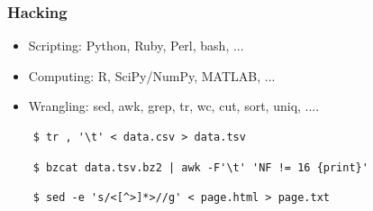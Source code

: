 \documentclass[xcolor=dvipsnames, 9pt]{beamer}
\begin{document}
\begin{frame}[fragile]
  \frametitle{Hacking}

  \begin{itemize}
    \item Scripting: Python, Ruby, Perl, bash, ...
    \item Computing: R, SciPy/NumPy, MATLAB, ...
    \item Wrangling: sed, awk, grep, tr, wc, cut, sort, uniq, ....
  \end{itemize}

  \begin{verbatim}
    $ tr , '\t' < data.csv > data.tsv
  \end{verbatim}

  \begin{verbatim}
    $ bzcat data.tsv.bz2 | awk -F'\t' 'NF != 16 {print}'
  \end{verbatim}

  \begin{verbatim}
    $ sed -e 's/<[^>]*>//g' < page.html > page.txt
  \end{verbatim}

\end{frame}
\end{document}

